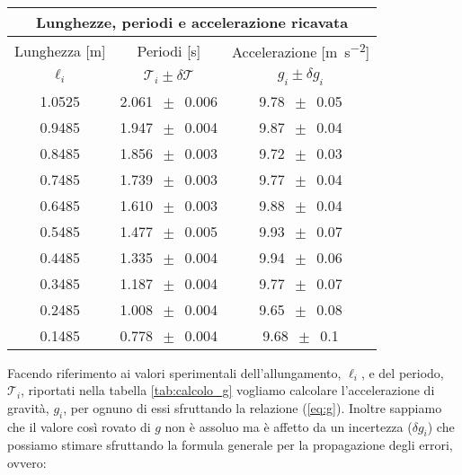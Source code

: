 \begin{SCtable}
    \centering
    \begin{tabular}{c c c}
        \multicolumn{3}{c}{\textbf{Lunghezze, periodi e accelerazione ricavata}} \\
        \toprule
        Lunghezza [\si{\metre}] & Periodi [\si{\second}] & Accelerazione [\si{\metre\per\square\second}] \\ %
        $\ell_i$ & $\mathcal{T}_i \pm \delta\mathcal{T}$ & $g_i \pm \delta g_i$ \\
        \midrule
			1.0525 & 2.061 $\,\pm\,$ 0.006 & 9.78 $\,\pm\,$ 0.05 \\
			0.9485 & 1.947 $\,\pm\,$ 0.004 & 9.87 $\,\pm\,$ 0.04 \\
			0.8485 & 1.856 $\,\pm\,$ 0.003 & 9.72 $\,\pm\,$ 0.03 \\
			0.7485 & 1.739 $\,\pm\,$ 0.003 & 9.77 $\,\pm\,$ 0.04 \\
			0.6485 & 1.610 $\,\pm\,$ 0.003 & 9.88 $\,\pm\,$ 0.04 \\
			0.5485 & 1.477 $\,\pm\,$ 0.005 & 9.93 $\,\pm\,$ 0.07 \\
			0.4485 & 1.335 $\,\pm\,$ 0.004 & 9.94 $\,\pm\,$ 0.06 \\
			0.3485 & 1.187 $\,\pm\,$ 0.004 & 9.77 $\,\pm\,$ 0.07 \\
			0.2485 & 1.008 $\,\pm\,$ 0.004 & 9.65 $\,\pm\,$ 0.08 \\
			0.1485 & 0.778 $\,\pm\,$ 0.004 & 9.68 $\,\pm\,$ 0.1 \\
        \bottomrule
    \end{tabular}
    \caption{In questa tebella sono riportate nella prima colonna le misure della lunghezza del filo che sono tutte affette da un'incertezza di 0.0006 m ricavata nel paragrafo precedente al punto \ref{l_medie}. Nella seconda colonna sono riportati i valori del periodo di oscillazione del pendolo relativo a ciscuna lunghezza. Questi valori derivano dalla msura di un periodo di dieci oscillazioni, ed è per questo che l'incertezza che li affligge risulta essere minore della risoluzione dello strumento si un fattore 10. Infine nella terza colonna sono riportati i valori di $g_i$ derivanti dai dati grazie all'equazione (\ref{eq:g}) e (\ref{eq:delta_g})}
    \label{tab:calcolo_g}
\end{SCtable}

Facendo riferimento ai valori sperimentali dell'allungamento, $\ell_i$, e del periodo, $\mathcal{T}_i$, riportati nella tabella \ref{tab:calcolo_g} vogliamo calcolare l'accelerazione di gravità, $g_i$, per ognuno di essi sfruttando la relazione (\ref{eq:g}). Inoltre sappiamo che il valore così rovato di $g$ non è assoluo ma è affetto da un incertezza ($\delta g_i$) che possiamo stimare sfruttando la formula generale per la propagazione degli errori, ovvero:

